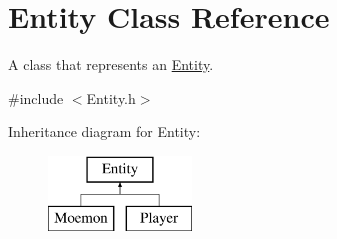 \hypertarget{class_entity}{\section{Entity Class Reference}
\label{class_entity}
}


A class that represents an \hyperlink{class_entity}{Entity}.  




{\ttfamily \#include $<$Entity.\+h$>$}

Inheritance diagram for Entity\+:\begin{figure}[H]
\begin{center}
\leavevmode
\includegraphics[height=2.000000cm]{class_entity}
\end{center}
\end{figure}
